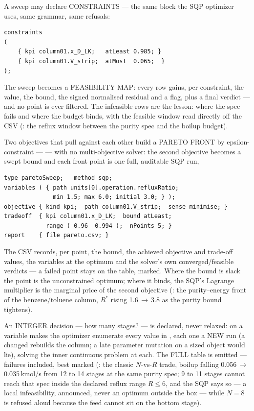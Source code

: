 \documentclass[11pt,a4paper]{article}
\begin{document}
A sweep may declare CONSTRAINTS --- the same block the SQP optimizer
uses, same grammar, same refusals:
\begin{lstlisting}[language=dict]
constraints
(
    { kpi column01.x_D_LK;   atLeast 0.985; }
    { kpi column01.V_strip;  atMost  0.065;  }
);
\end{lstlisting}
The sweep becomes a FEASIBILITY MAP: every row gains, per constraint,
the value, the bound, the signed normalised residual and a
 flag, plus a final  verdict --- and no
point is ever filtered.  The infeasible rows are the lesson: where the
spec fails and where the budget binds, with the feasible window read
directly off the CSV
(: the reflux window between the
purity spec and the boilup budget).

Two objectives that pull against each other build a PARETO FRONT by
epsilon-constraint ---  --- with no
multi-objective solver: the second objective becomes a swept bound and
each front point is one full, auditable SQP run,
\begin{lstlisting}[language=dict]
type paretoSweep;   method sqp;
variables ( { path units[0].operation.refluxRatio;
              min 1.5; max 6.0; initial 3.0; } );
objective { kind kpi;  path column01.V_strip;  sense minimise; }
tradeoff  { kpi column01.x_D_LK;  bound atLeast;
            range ( 0.96  0.994 );  nPoints 5; }
report    { file pareto.csv; }
\end{lstlisting}
The CSV records, per point, the bound, the achieved objective and
trade-off values, the variables at the optimum and the solver's own
converged/feasible verdicts --- a failed point stays on the table,
marked.  Where the bound is slack the point is the unconstrained
optimum; where it binds, the SQP's Lagrange multiplier is the marginal
price of the second objective
(: the purity--energy front of the
benzene/toluene column, $R^*$ rising 1.6\,$\to$\,3.8 as the purity
bound tightens).

An INTEGER decision --- how many stages? --- is declared, never
relaxed:  on a variable makes the optimizer
enumerate every value in , each one a NEW run (a changed
 rebuilds the column; a late parameter mutation on a
sized object would lie), solving the inner continuous problem at each.
The FULL table is emitted --- failures included, best marked
(: the classic $N$-vs-$R$ trade, boilup
falling 0.056\,$\to$\,0.035\,kmol/s from 12 to 14 stages at the same
purity spec; 9 to 11 stages cannot reach that spec inside the declared
reflux range $R \le 6$, and the SQP says so --- a local infeasibility,
announced, never an optimum outside the box --- while $N=8$ is refused
aloud because the feed cannot sit on the bottom stage).
\end{document}
